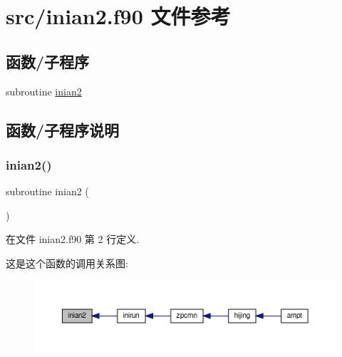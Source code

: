 \hypertarget{inian2_8f90}{}\section{src/inian2.f90 文件参考}
\label{inian2_8f90}
\subsection*{函数/子程序}
\begin{DoxyCompactItemize}
\item 
subroutine \mbox{\hyperlink{inian2_8f90_a1ca2c4729a11eac7f404a494f521bbe6}{inian2}}
\end{DoxyCompactItemize}


\subsection{函数/子程序说明}
\mbox{\label{inian2_8f90_a1ca2c4729a11eac7f404a494f521bbe6}} 
\subsubsection{\texorpdfstring{inian2()}{inian2()}}
{\footnotesize\ttfamily subroutine inian2 (\begin{DoxyParamCaption}{ }\end{DoxyParamCaption})}



在文件 inian2.\+f90 第 2 行定义.

这是这个函数的调用关系图\+:
\nopagebreak
\begin{figure}[H]
\begin{center}
\leavevmode
\includegraphics[width=350pt]{inian2_8f90_a1ca2c4729a11eac7f404a494f521bbe6_icgraph}
\end{center}
\end{figure}
